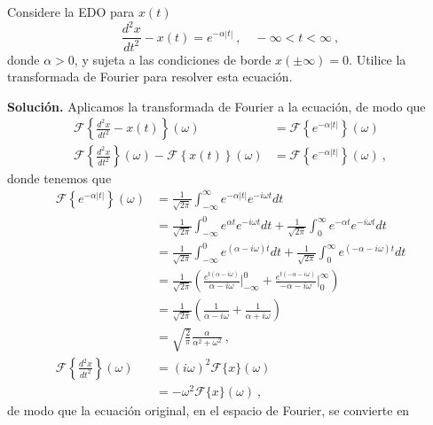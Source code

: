 \begin{ejemplo}
    Considere la EDO para $x(t)$
    \begin{equation}
        \frac{d^2 x}{dt^2} - x(t) = e^{-\alpha |t|} \ , \quad -\infty < t < \infty \ ,
    \end{equation}
    donde $\alpha > 0$, y sujeta a las condiciones de borde $x(\pm \infty) = 0$. Utilice la transformada de Fourier para resolver esta ecuación.
    
    \textbf{Solución.} Aplicamos la transformada de Fourier a la ecuación, de modo que
    \begin{align}
        \mathcal{F}\left\{ \frac{d^2 x}{dt^2} - x(t) \right\}(\omega) & =  \mathcal{F} \left\{ e^{-\alpha |t|} \right\}(\omega) \\
        \mathcal{F} \left\{ \frac{d^2x}{dt^2} \right\}(\omega) - \mathcal{F} \left\{ x(t) \right\}(\omega)  & = \mathcal{F} \left\{ e^{-\alpha |t|} \right\}(\omega) \ ,
    \end{align}
    donde tenemos que
    \begin{align}
        \mathcal{F} \left\{ e^{-\alpha |t|} \right\}(\omega) & = \frac{1}{\sqrt{2\pi}} \int_{-\infty}^\infty e^{-\alpha |t|} e^{-i\omega t} dt \nonumber \\
        & = \frac{1}{\sqrt{2\pi}} \int_{-\infty}^0 e^{\alpha t} e^{-i\omega t} dt + \frac{1}{\sqrt{2\pi}} \int_0^\infty e^{-\alpha t} e^{-i\omega t} dt \nonumber \\
        & = \frac{1}{\sqrt{2\pi}} \int_{-\infty}^0 e^{(\alpha -i\omega) t} dt + \frac{1}{\sqrt{2\pi}} \int_0^\infty e^{(-\alpha -i\omega) t} dt \nonumber \\
        & = \frac{1}{\sqrt{2\pi}} \left( \frac{e^{t(\alpha - i \omega)}}{\alpha - i\omega} \left.\right|_{-\infty}^0 + \frac{e^{t(-\alpha - i \omega)}}{-\alpha - i\omega} \left.\right|_0^{\infty}\right) \nonumber \\
        & = \frac{1}{\sqrt{2\pi}} \left( \frac{1}{\alpha - i\omega} + \frac{1}{\alpha + i\omega} \right) \nonumber \\
        & = \sqrt{\frac{2}{\pi}} \frac{\alpha}{\alpha^2 + \omega^2} \ , \\
        \mathcal{F} \left\{ \frac{d^2x}{dt^2} \right\}(\omega) & = (i\omega)^2 \mathcal{F}\{ x \}(\omega) \nonumber \\
        & = -\omega^2 \mathcal{F}\{ x \}(\omega) \ ,
    \end{align}
    de modo que la ecuación original, en el espacio de Fourier, se convierte en
    \begin{equation}

\end{equation}
\end{ejemplo}
